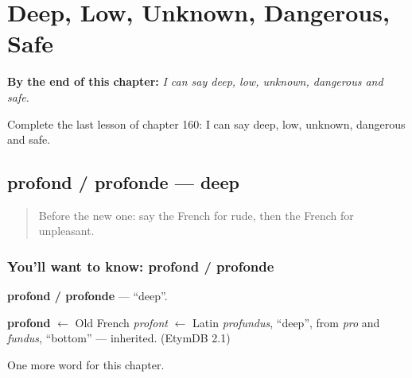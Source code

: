 
\chapter{Deep, Low, Unknown, Dangerous, Safe}
\label{ch:fr-deep-low-unknown-dangerous-safe}

\begin{chapteropening}
\textbf{By the end of this chapter:} \emph{I can say deep, low, unknown, dangerous and safe.}

Complete the last lesson of chapter 160: I can say deep, low, unknown, dangerous and safe.
\end{chapteropening}

\section[profond / profonde]{profond / profonde — deep}

\label{lesson:FR-C160-profond-profonde}



\begin{quote}
Before the new one: say the French for rude, then the French for unpleasant.
\end{quote}

\subsection*{You'll want to know: profond / profonde}
\textbf{profond / profonde} — \textquotedblleft{}deep\textquotedblright{}.

\begin{cousinweb}
\textbf{profond} $\leftarrow$ Old French \emph{profont} $\leftarrow$ Latin \emph{profundus}, \textquotedblleft{}deep\textquotedblright{}, from \emph{pro} and \emph{fundus}, \textquotedblleft{}bottom\textquotedblright{} — inherited. (EtymDB 2.1)
\end{cousinweb}

\begin{grammarlens}[title={What you've built}]
One more word for this chapter.
\end{grammarlens}


